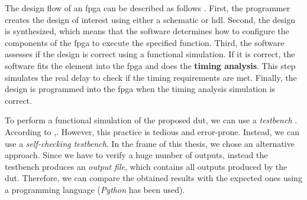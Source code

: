 The design flow of an \acrshort{fpga} can be described as follows \cite{barte_value-added_2011}. First, the programmer creates the design of interest using either a schematic or \acrshort{hdl}. Second, the design is synthesized, which means that the software determines how to configure the components of the \acrshort{fpga} to execute the specified function. Third, the software assesses if the design is correct using a functional simulation. If it is correct, the software fits the element into the \acrshort{fpga} and does the \textbf{timing analysis}. This step simulates the real delay to check if the timing requirements are met. Finally, the design is programmed into the \acrshort{fpga} when the timing analysis simulation is correct.

To perform a functional simulation of the proposed \acrfull{dut}, we can use a \textit{testbench} \cite{harris_digital_2015}. According to \textcite{harris_digital_2015},. However, this practice is tedious and error-prone. Instead, we can use a \textit{self-checking testbench}. In the frame of this thesis, we chose an alternative approach. Since we have to verify a huge number of outputs, instead the testbench produces an \textit{output file}, which contains all outputs produced by the \acrshort{dut}. Therefore, we can compare the obtained results with the expected ones using a programming language (\textit{Python} has been used).